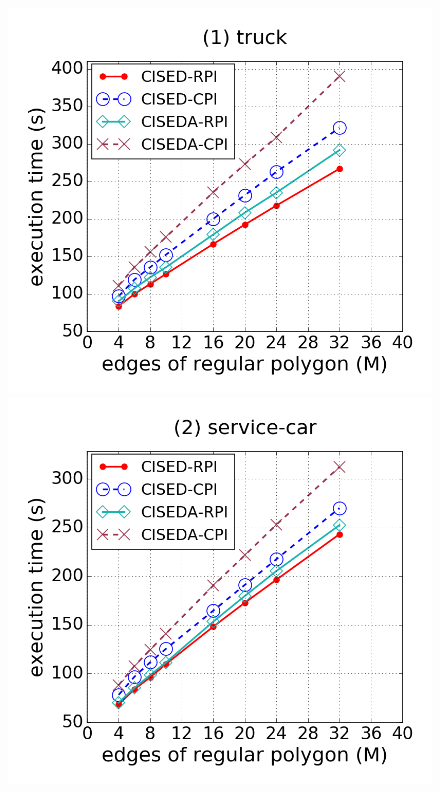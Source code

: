 \begin{figure}[tb!]
\centering
\includegraphics[scale = 0.245]{figures/Exp-M-e-60-time-truck.png}
\includegraphics[scale = 0.245]{figures/Exp-M-e-60-time-service.png}

\end{figure}
